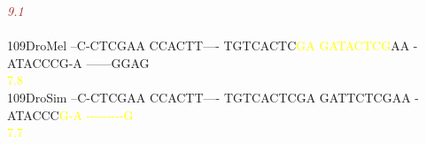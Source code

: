 \documentclass[11pt,twoside,reqno,a4paper]{article}
\begin{document}
{\hspace*{4\charwidth}\hspace*{7\charwidth}\hspace*{6\charwidth}\textit{\textcolor{Brown}{9.1}}\hspace*{1\charwidth}\hspace*{1\charwidth}\hspace*{1\charwidth}\hspace*{1\charwidth}\hspace*{1\charwidth}\hspace*{1\charwidth}\\
\\
109\hspace*{1\charwidth}DroMel	--C-CTCGAA	CCACTT----	TGTCACTC\textcolor{Yellow}{G}\textcolor{Yellow}{A}	\textcolor{Yellow}{G}\textcolor{Yellow}{A}\textcolor{Yellow}{T}\textcolor{Yellow}{A}\textcolor{Yellow}{C}\textcolor{Yellow}{T}\textcolor{Yellow}{C}\textcolor{Yellow}{G}AA	-ATACCCG-A	------GGAG	\\
\hspace*{4\charwidth}\hspace*{7\charwidth}\hspace*{1\charwidth}\hspace*{1\charwidth}\hspace*{28\charwidth}\textcolor{Yellow}{7.8}\hspace*{1\charwidth}\hspace*{1\charwidth}\hspace*{1\charwidth}\hspace*{1\charwidth}\\
109\hspace*{1\charwidth}DroSim	--C-CTCGAA	CCACTT----	TGTCACTCGA	GATTCTCGAA	-ATACCC\textcolor{Yellow}{G}\textcolor{Yellow}{-}\textcolor{Yellow}{A}	\textcolor{Yellow}{-}\textcolor{Yellow}{-}\textcolor{Yellow}{-}\textcolor{Yellow}{-}\textcolor{Yellow}{-}\textcolor{Yellow}{-}\textcolor{Yellow}{-}\textcolor{Yellow}{-}\textcolor{Yellow}{-}\textcolor{Yellow}{G}	\\
\hspace*{4\charwidth}\hspace*{7\charwidth}\hspace*{1\charwidth}\hspace*{1\charwidth}\hspace*{1\charwidth}\hspace*{1\charwidth}\hspace*{47\charwidth}\textcolor{Yellow}{7.7}\hspace*{1\charwidth}\hspace*{1\charwidth}\\
}
\end{document}
